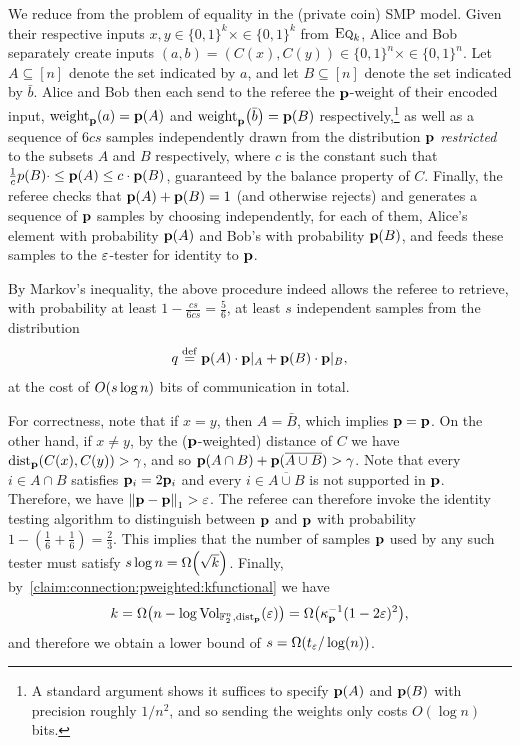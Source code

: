 We reduce from the problem of equality in the (private coin) SMP model. Given their respective inputs $x,y\in\{0,1\}^k\times \in\{0,1\}^k$ from $\EQ[k]$, Alice and Bob separately create inputs $(a,b)=(C(x),C(y))\in\{0,1\}^n\times \in\{0,1\}^n$. Let $A\subseteq[n]$ denote the set indicated by $a$, and let $B\subseteq[n]$ denote the set indicated by $\bar{b}$. Alice and Bob then each send to the referee the $\p$-weight of their encoded input, $\pweight[\p]{a}=\p(A)$ and $\pweight[\p]{\bar{b}}=\p(B)$ respectively,\footnote{A standard argument shows it suffices to specify $\p(A)$ and $\p(B)$ with precision roughly $1/n^2$, and so sending the weights only costs $O(\log n)$ bits.} as well as a sequence of $6cs$ samples independently drawn from the distribution $\p$ \emph{restricted} to the subsets $A$ and $B$ respectively, where $c$ is the constant such that $\frac{1}{c}p(B) \cdot \leq \p(A) \leq c \cdot \p(B)$, guaranteed by the balance property of $C$. Finally, the referee checks that $\p(A)+\p(B)=1$ (and otherwise rejects) and generates a sequence of $\q$ samples by choosing independently, for each of them, Alice's element with probability $\p(A)$ and Bob's with probability $\p(B)$, and feeds these samples to the $\eps$-tester for identity to $\p$.

By Markov's inequality, the above procedure indeed allows the referee to retrieve, with probability at least $1-\frac{cs}{6cs}=\frac{5}{6}$, at least $s$ independent samples from the distribution 
\[
q \eqdef \p(A) \cdot \p|_A + \p(B) \cdot \p|_B,
\] 
at the cost of $\bigO{s\log n}$ bits of communication in total.

For correctness, note that if $x=y$, then $A=\bar{B}$, which implies $\q=\p$. On the other hand, if $x\neq y$, by the ($\p$-weighted) distance of $C$ we have $\pdist[\p]{C(x)}{C(y)} > \gamma$, and so $\p(A \cap B) +\p(\overline{A \cup B})  > \gamma$. Note that every $i \in A \cap B$ satisfies $\q_i = 2\p_i$ and every $i \in \overline{A \cup B}$ is not supported in $\q$. Therefore, we have $\normone{\p-\q} > \eps$. The referee can therefore invoke the identity testing algorithm to distinguish between $\p$ and $\q$ with probability $1-(\frac{1}{6}+\frac{1}{6}) = \frac{2}{3}$. This implies that the number of samples $\q$ used by any such tester must satisfy $s\log n =\bigOmega{\sqrt{k}}$. Finally, by~\cref{claim:connection:pweighted:kfunctional} we have
\[
    k = \bigOmega{ n - \log \operatorname{Vol}_{\mathbb{F}_2^n,\pdistfunc[\p]}(\eps) } = \bigOmega{ \kf{\p}^{-1}(1-2\eps)^2 },
\]
and therefore we obtain a lower bound of $s = \bigOmega{t_\eps/\log(n)}$.


